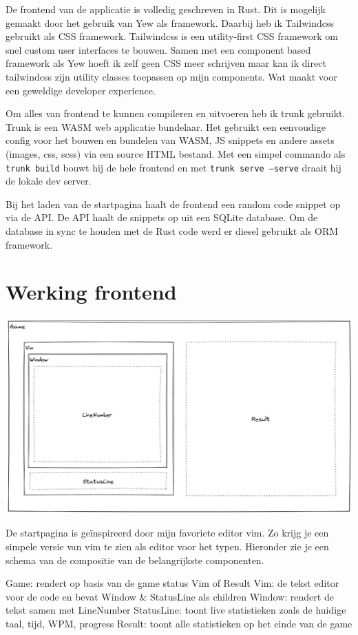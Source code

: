 De frontend van de applicatie is volledig geschreven in Rust. Dit is mogelijk gemaakt door het
gebruik van Yew als framework. Daarbij heb ik Tailwindcss gebruikt als CSS framework. Tailwindcss is
een utility-first CSS framework om snel custom user interfaces te bouwen. Samen met een component
based framework als Yew hoeft ik zelf geen CSS meer schrijven maar kan ik direct tailwindcss zijn
utility classes toepassen op mijn components. Wat maakt voor een geweldige developer experience. 

Om alles van frontend te kunnen compileren en uitvoeren heb ik trunk gebruikt. Trunk is een WASM web
applicatie bundelaar. Het gebruikt een eenvoudige config voor het bouwen en bundelen van WASM, JS
snippets en andere assets (images, css, scss) via een source HTML bestand. Met een simpel commando
als \texttt{trunk build} bouwt hij de hele frontend en met \texttt{trunk serve
--serve} draait hij de lokale dev server.  

Bij het laden van de startpagina haalt de frontend een random code snippet op via de API. De API
haalt de snippets op uit een SQLite database. Om de database in sync te houden met de Rust code werd
er diesel gebruikt als ORM framework.


\section{Werking frontend}

\includegraphics[width=\textwidth]{./figures/components.png}

De startpagina is geïnspireerd door mijn favoriete editor vim. Zo krijg je een simpele versie van
vim te zien als editor voor het typen. Hieronder zie je een schema van de compositie van de
belangrijkste componenten.

Game: rendert op basis van de game status Vim of Result 
Vim: de tekst editor voor de code en bevat Window \& StatusLine als children 
Window: rendert de tekst samen met LineNumber 
StatusLine: toont live statistieken zoals de huidige taal, tijd, WPM, progress 
Result: toont alle statistieken op het einde van de game

